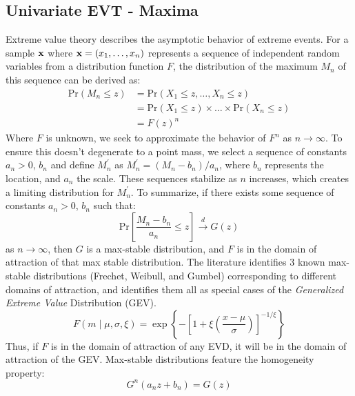 \subsection{Univariate EVT - Maxima}
Extreme value theory describes the asymptotic behavior of extreme events.  For a
  sample ${\bf x}$ where ${\bf x} = (x_1,\ldots,x_n)$ represents a sequence of
  independent random variables from a distribution function $F$, the
  distribution of the maximum $M_n$ of this sequence can be derived as:
\begin{equation*}
\begin{aligned}
\text{Pr}(M_n\leq z) &= \text{Pr}(X_1 \leq z, \ldots, X_n \leq z)\\
&= \text{Pr}(X_1\leq z)\times\ldots\times\text{Pr}(X_n\leq z)\\
&= F(z)^n
\end{aligned}
\end{equation*}
Where $F$ is unknown, we seek to approximate the behavior of $F^n$ as
  $n\rightarrow\infty$.  To ensure this doesn't degenerate to a point mass, we
  select a sequence of constants $a_n > 0$, $b_n$ and define $M_n^{\prime}$ as
  $M_n^{\prime} = (M_n - b_n)/a_n$, where $b_n$ represents the location, and
  $a_n$ the scale.  These sequences stabilize as $n$ increases, which creates a
  limiting distribution for $M_n^{\prime}$. To summarize, if there exists some
  sequence of constants $a_n > 0$, $b_n$ such that:
\begin{equation*}
\text{Pr}\left[\frac{M_n - b_n}{a_n} \leq z\right] \stackrel{d}{\rightarrow} G(z)
\end{equation*}
as $n\rightarrow\infty$, then $G$ is a max-stable distribution, and $F$ is in
  the domain of attraction of that max stable distribution.  The literature
  identifies 3 known max-stable distributions (Frechet, Weibull, and Gumbel)
  corresponding to different domains of attraction, and identifies them all as
  special cases of the \emph{Generalized Extreme Value} Distribution (GEV).
\begin{equation*}
  \label{eqn:gev}
  F(m \mid \mu, \sigma, \xi) = \exp\left\lbrace-\left[1 + \xi\left(\frac{x - \mu}{\sigma}\right)\right]^{-1/{\xi}}\right\rbrace
\end{equation*}
Thus, if $F$ is in the domain of attraction of any EVD, it will be in the domain
  of attraction of the GEV.  Max-stable distributions feature the homogeneity
  property:
\begin{equation*}
G^n(a_nz + b_n) = G(z)
\end{equation*}

